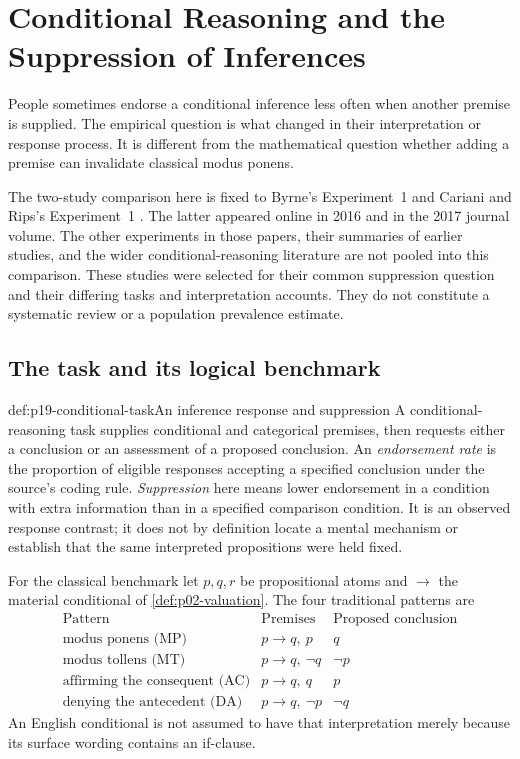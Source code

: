\chapter{Conditional Reasoning and the Suppression of Inferences}
\label{sec:p19-conditional-reasoning-suppression}

People sometimes endorse a conditional inference less often when another
premise is supplied. The empirical question is what changed in their
interpretation or response process. It is different from the mathematical
question whether adding a premise can invalidate classical modus ponens.

The two-study comparison here is fixed to Byrne's Experiment~1
\cite[pp.~66--69, table~1 and appendix p.~80]{Byrne1989Suppression}
and Cariani and Rips's Experiment~1
\cite[Secs.~2.3, 5.1--5.2]{CarianiRips2017Suppression}.
The latter appeared online in 2016 and in the 2017 journal volume.
The other experiments in those papers, their summaries of earlier studies,
and the wider conditional-reasoning literature are not pooled into this
comparison. These studies were selected for their common suppression
question and their differing tasks and interpretation accounts. They do
not constitute a systematic review or a population prevalence estimate.

\section{The task and its logical benchmark}
\label{sec:p19-suppression-benchmark}

\begin{hbdefinition}{def:p19-conditional-task}{An inference response and suppression}
A conditional-reasoning task supplies conditional and categorical premises,
then requests either a conclusion or an assessment of a proposed conclusion.
An \emph{endorsement rate} is the proportion of eligible responses accepting
a specified conclusion under the source's coding rule. \emph{Suppression}
here means lower endorsement in a condition with extra information than
in a specified comparison condition. It is an observed response contrast;
it does not by definition locate a mental mechanism or establish that the
same interpreted propositions were held fixed.

For the classical benchmark let \(p,q,r\) be propositional atoms and
\(\to\) the material conditional of \cref{def:p02-valuation}. The four
traditional patterns are
\[
\begin{array}{c|c|c}
 \text{Pattern}&\text{Premises}&\text{Proposed conclusion}\\\hline
 \text{modus ponens (MP)}&p\to q,\ p&q\\
 \text{modus tollens (MT)}&p\to q,\ \neg q&\neg p\\
 \text{affirming the consequent (AC)}&p\to q,\ q&p\\
 \text{denying the antecedent (DA)}&p\to q,\ \neg p&\neg q
\end{array}
\]
An English conditional is not assumed to have that interpretation merely
because its surface wording contains an if-clause.
\end{hbdefinition}

